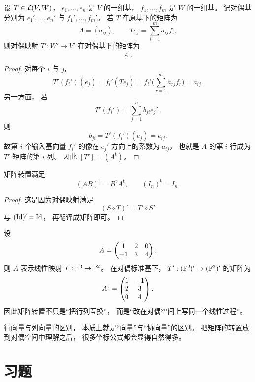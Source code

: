 \begin{theorem} 设 $T\in\mathcal{L}(V,W)$， $e_1,\dots,e_n$ 是 $V$ 的一组基， $f_1,\dots,f_m$ 是 $W$ 的一组基。 记对偶基分别为 $e_1',\dots,e_n'$ 与 $f_1',\dots,f_m'$。 若 $T$ 在原基下的矩阵为 \[ A=(a_{ij}), \qquad Te_j=\sum_{i=1}^m a_{ij}f_i, \] 则对偶映射 $T':W'\to V'$ 在对偶基下的矩阵为 \[ A^{\mathrm t}. \] \end{theorem}




\begin{proof} 对每个 $i$ 与 $j$， \[ T'(f_i')(e_j)=f_i'(Te_j)=f_i'\Big(\sum_{r=1}^m a_{rj}f_r\Big)=a_{ij}. \] 另一方面， 若 \[ T'(f_i')=\sum_{j=1}^n b_{ji}e_j', \] 则 \[ b_{ji}=T'(f_i')(e_j)=a_{ij}. \] 故第 $i$ 个输入基向量 $f_i'$ 的像在 $e_j'$ 方向上的系数为 $a_{ij}$， 也就是 $A$ 的第 $i$ 行成为 $T'$ 矩阵的第 $i$ 列。 因此 $[T']=(A^{\mathrm t})$。 \end{proof}




\begin{corollary} 矩阵转置满足 \[ (AB)^{\mathrm t}=B^{\mathrm t}A^{\mathrm t}, \qquad (I_n)^{\mathrm t}=I_n. \] \end{corollary}




\begin{proof} 这是因为对偶映射满足 \[ (S\circ T)'=T'\circ S' \] 与 $(\mathrm{Id})'=\mathrm{Id}$， 再翻译成矩阵即可。 \end{proof}




\begin{example} 设 \[ A=\begin{pmatrix} 1&2&0\\-1&3&4 \end{pmatrix}. \] 则 $A$ 表示线性映射 $T:\mathbb{F}^3\to\mathbb{F}^2$。 在对偶标准基下， $T':(\mathbb{F}^2)'\to(\mathbb{F}^3)'$ 的矩阵为 \[ A^{\mathrm t}=\begin{pmatrix} 1&-1\\2&3\\0&4 \end{pmatrix}. \] 因此矩阵转置不只是“把行列互换”， 而是“改在对偶空间上写同一个线性过程”。 \end{example}




\begin{remark} 行向量与列向量的区别， 本质上就是“向量”与“协向量”的区别。 把矩阵的转置放到对偶空间中理解之后， 很多坐标公式都会显得自然得多。 \end{remark}




\section*{习题}




